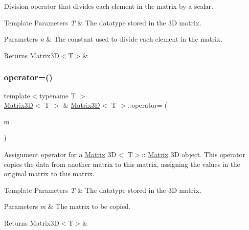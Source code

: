 Division operator that divides each element in the matrix by a scalar. 


\begin{DoxyTemplParams}{Template Parameters}
{\em T} & The datatype stored in the 3D matrix. \\
\hline
\end{DoxyTemplParams}

\begin{DoxyParams}{Parameters}
{\em n} & The constant used to divide each element in the matrix.\\
\hline
\end{DoxyParams}
\begin{DoxyReturn}{Returns}
Matrix3\+D$<$\+T$>$\& 
\end{DoxyReturn}
\mbox{\label{classMatrix3D_a0e84724f089ae3478283ea81d0b866af}} 
\subsubsection{\texorpdfstring{operator=()}{operator=()}}
{\footnotesize\ttfamily template$<$typename T $>$ \\
\mbox{\hyperlink{classMatrix3D}{Matrix3D}}$<$ T $>$ \& \mbox{\hyperlink{classMatrix3D}{Matrix3D}}$<$ T $>$\+::operator= (\begin{DoxyParamCaption}\item[{const \mbox{\hyperlink{classMatrix3D}{Matrix3D}}$<$ T $>$ \&}]{m }\end{DoxyParamCaption})}



Assignment operator for a \mbox{\hyperlink{classMatrix}{Matrix}} 3D$<$ T$>$\+:\+: \mbox{\hyperlink{classMatrix}{Matrix}} 3D object. This operator copies the data from another matrix to this matrix, assigning the values in the original matrix to this matrix. 


\begin{DoxyTemplParams}{Template Parameters}
{\em T} & The datatype stored in the 3D matrix. \\
\hline
\end{DoxyTemplParams}

\begin{DoxyParams}{Parameters}
{\em m} & The matrix to be copied.\\
\hline
\end{DoxyParams}
\begin{DoxyReturn}{Returns}
Matrix3\+D$<$\+T$>$\& 
\end{DoxyReturn}
\mbox{\label{classMatrix3D_abc1d3451a2fb3cce0bec1d1e33097b1e}} 
